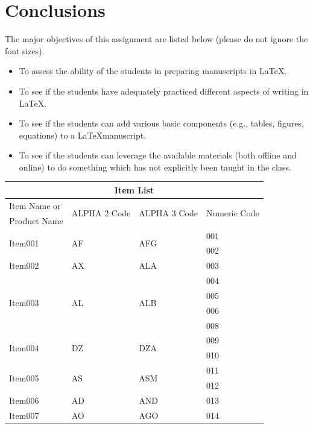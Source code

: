\documentclass[14pt, a4paper]{article} %
\begin{document}
    \section{Conclusions}
    The major objectives of this assignment are listed below (please do not ignore the font sizes).
    \begin{itemize}
     \item {\huge{To assess the ability of the students in preparing manuscripts in \LaTeX.}
     }
     \item {\large{ To see if the students have adequately practiced different aspects of writing in \LaTeX.
     }}
     \item{To see if the students can add various basic components (e.g., tables, figures, equations) to a \LaTeX manuscript.
     }
     \item {\small{To see if the students can leverage the available materials (both offline and online) to do something which has not explicitly been taught in the class.
     }}
    \end{itemize}
    \begin{table}[b]
    \centering
    \begin{tabular}{|l||l|l|l|}
    \hline
    \multicolumn{4}{|c|}{Item List} \\ \hline
    Item Name or & \multirow{2}{*}{ALPHA 2 Code} & \multirow{2}{*}{ALPHA 3 Code} & \multirow{2}{*}{Numeric Code} \\ \cline{1-1}
    Product Name &  &  &  \\ \hline
    \multirow{2}{*}{Item001} & \multirow{2}{*}{AF} & \multirow{2}{*}{AFG} & 001 \\
    &  &  & 002 \\ \hline
    Item002 & AX & ALA & 003 \\ \hline
    \multirow{4}{*}{Item003} & \multirow{4}{*}{AL} & \multirow{4}{*}{ALB} & 004 \\
    &  &  & 005 \\
    &  &  & 006 \\
    &  &  & 008 \\ \hline
    \multirow{2}{*}{Item004} & \multirow{2}{*}{DZ} & \multirow{2}{*}{DZA} & 009 \\
    &  &  & 010 \\ \hline
    \multirow{2}{*}{Item005} & \multirow{2}{*}{AS} & \multirow{2}{*}{ASM} & 011 \\
    &  &  & 012 \\ \hline
    Item006 & AD & AND & 013 \\ \hline
    Item007 & AO & AGO & 014 \\ \hline \hline
    \end{tabular}
    \end{table}
\end{document}
